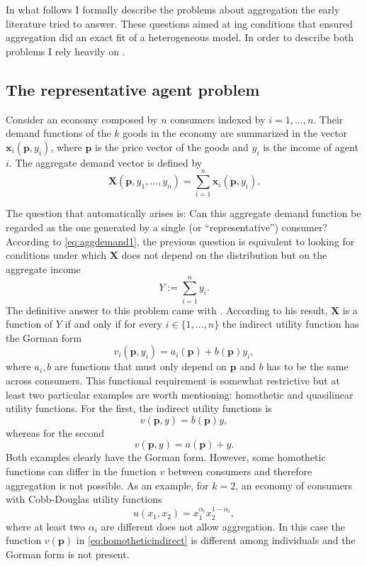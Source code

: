 \documentclass[english, a4paper, 12pt]{article}
\begin{document}
In what follows I formally describe the problems about aggregation the early literature tried to answer. These questions aimed at ing conditions that ensured aggregation did an exact fit of a heterogeneous model. In order to describe both problems I rely heavily on \cite{VarianBook}.

\subsection{The representative agent problem} \label{ssec:RepAgent}
Consider an economy composed by $n$ consumers indexed by $i = 1, \ldots, n$. Their demand functions of the $k$ goods in the economy are summarized in the vector $\mathbf{x}_{i}(\mathbf{p}, y_{i})$, where $\mathbf{p}$ is the price vector of the goods and $y_{i}$ is the income of agent $i$. The aggregate demand vector is defined by
	\begin{equation} \label{eq:aggdemand1}
		\mathbf{X}(\mathbf{p}, y_{1}, \ldots, y_{n}) = \sum_{i=1}^{n} \mathbf{x}_{i}(\mathbf{p},y_{i}).
	\end{equation}

The question that automatically arises is: Can this aggregate demand function be regarded as the one generated by a single (or ``representative'') consumer? According to \eqref{eq:aggdemand1}, the previous question is equivalent to looking for conditions under which $\mathbf{X}$ does not depend on the distribution but on the aggregate income
	$$Y := \sum_{i=1}^{n} y_{i}.$$
The definitive answer to this problem came with \cite{Gorman53}. According to his result, $\mathbf{X}$ is a function of $Y$ if and only if for every $i \in \{1,\ldots,n\}$ the indirect utility function has the Gorman form
	$$v_{i}(\mathbf{p}, y_{i}) = a_{i}(\mathbf{p}) + b(\mathbf{p})y_{i},$$ 
where $a_{i}, b$ are functions that must only depend on $\mathbf{p}$ and $b$ has to be the same across consumers. This functional requirement is somewhat restrictive but at least two particular examples are worth mentioning: homothetic and quasilinear utility functions. For the first, the indirect utility functions is
	\begin{equation} \label{eq:homotheticindirect}
		v(\mathbf{p}, y) = b(\mathbf{p})y,
	\end{equation}
whereas for the second
	$$v(\mathbf{p}, y) = a(\mathbf{p}) + y.$$
Both examples clearly have the Gorman form. However, some homothetic functions can differ in the function $v$ between consumers and therefore aggregation is not possible. As an example, for $k = 2$, an economy of consumers with Cobb-Douglas utility functions
	$$u(x_{1}, x_{2}) = x_{1}^{\alpha_{i}}x_{2}^{1-\alpha_{i}},$$
where at least two $\alpha_{i}$ are different does not allow aggregation. In this case the function $v(\mathbf{p})$ in \eqref{eq:homotheticindirect} is different among individuals and the Gorman form is not present.
\end{document}
